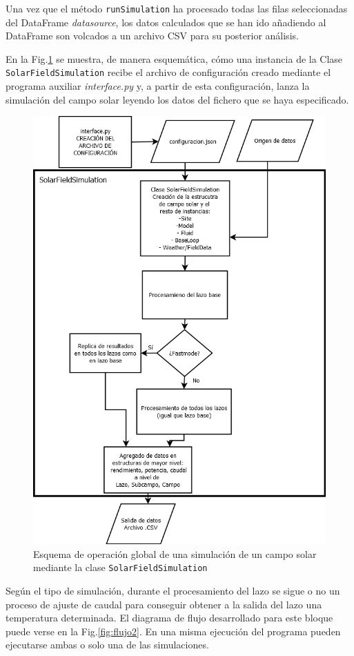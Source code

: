 Una vez que el método \texttt{runSimulation} ha procesado todas las filas seleccionadas del DataFrame \emph{datasource}, los datos calculados que se han ido añadiendo al DataFrame son volcados a un archivo CSV para su posterior análisis.

En la Fig.\ref{fig:flujo1} se muestra, de manera esquemática, cómo una instancia de la Clase \texttt{SolarFieldSimulation} recibe el archivo de configuración creado mediante el programa auxiliar \emph{interface.py} y, a partir de esta configuración, lanza la simulación del campo solar leyendo los datos del fichero que se haya especificado. 

\begin{figure}[H]
\includegraphics[width=0.80\linewidth]{images/flujo1.png}
\caption{Esquema de operación global de una simulación de un campo solar mediante la clase \texttt{SolarFieldSimulation}} 
\label{fig:flujo1}
\end{figure}

Según el tipo de simulación, durante el procesamiento del lazo se sigue o no un proceso de ajuste de caudal para conseguir obtener a la salida del lazo una temperatura determinada. El diagrama de flujo desarrollado para este bloque puede verse en la Fig.\ref{fig:flujo2}. En una misma ejecución del programa pueden ejecutarse ambas o solo una de las simulaciones.

